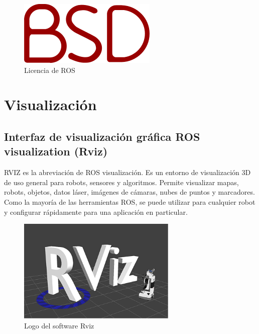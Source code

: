             \begin{figure}[htb]
                \centering
                \includegraphics[width=0.3\linewidth]{Main/Chapter3/Images3/3-5/licnecia-bsd-ros.png}
                \caption{Licencia de ROS}
                \label{f:Cap3-5_multilenguaje_ros}
            \end{figure}
            
        
            
    
        
    
        
    
    
       
       
\newpage

\section{Visualización}
    
    \subsection{Interfaz de visualización gráfica ROS visualization (Rviz)}

        RVIZ es la abreviación de ROS visualización. Es un entorno de visualización 3D de uso general para robots, sensores y algoritmos. Permite visualizar mapas, robots, objetos, datos láser, imágenes de cámaras, nubes de puntos y marcadores.   Como la mayoría de las herramientas ROS, se puede utilizar para cualquier robot y configurar rápidamente para una aplicación en particular.
        
        \begin{figure}[htb]
            \centering
            \includegraphics[width=0.5\linewidth]{Main/Chapter3/Images3/3-6/logo-rviz.png}
            \caption{Logo del software Rviz}
            \label{f:Cap3-6_logo_rviz}
        \end{figure}
        
